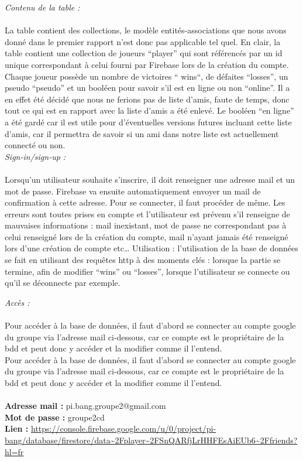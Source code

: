 \documentclass[a4paper,11pt]{article}
\begin{document}
\textit{Contenu de la table :} \\\\
	La table contient des collections, le modèle entités-associations que nous avons donné dans le premier rapport n’est donc pas applicable tel quel. En clair, la table contient une collection de joueurs “player” qui sont référencés par un id unique correspondant à celui fourni par Firebase lors de la création du compte. Chaque joueur possède un nombre de victoires “ wins“, de défaites “losses”, un pseudo “pseudo” et un booléen pour savoir s’il est en ligne ou non “online”. Il a en effet été décidé que nous ne ferions pas de liste d’amis, faute de temps, donc tout ce qui est en rapport avec la liste d’amis a été enlevé. Le booléen “en ligne” a été gardé car il est utile pour d’éventuelles versions futures incluant cette liste d’amis, car il permettra de savoir si un ami dans notre liste est actuellement connecté ou non. \\

\textit{Sign-in/sign-up :} \\\\ 
	Lorsqu’un utilisateur souhaite s’inscrire, il doit renseigner une adresse mail et un mot de passe. Firebase va ensuite automatiquement envoyer un mail de confirmation à cette adresse. Pour se connecter, il faut procéder de même. Les erreurs sont toutes prises en compte et l’utilisateur est prévenu s’il renseigne de mauvaises informations : mail inexistant, mot de passe ne correspondant pas à celui renseigné lors de la création du compte, mail n’ayant jamais été renseigné lors d’une création de compte etc…
Utilisation : l’utilisation de la base de données se fait en utilisant des requêtes http à des moments clés : lorsque la partie se termine, afin de modifier “wins” ou “losses”, lorsque l’utilisateur se connecte ou qu’il se déconnecte par exemple. \\

\newpage

\textit{Accès :} \\\\
Pour accéder à la base de données, il faut d’abord se connecter au compte google du groupe via l’adresse mail ci-dessous, car ce compte est le propriétaire de la bdd et peut donc y accéder et la modifier comme il l’entend. \\


Pour accéder à la base de données, il faut d’abord se connecter au compte google du groupe via l’adresse mail ci-dessous, car ce compte est le propriétaire de la bdd et peut donc y accéder et la modifier comme il l’entend. \\
\\
\textbf{Adresse mail :} pi.bang.groupe2@gmail.com \hfill  \\
\textbf{Mot de passe :} groupe2cd  \\
\textbf{Lien :} \url {https://console.firebase.google.com/u/0/project/pi-bang/database/firestore/data~2Fplayer~2FSnQARfjLrHHFEsAiEUb6~2Ffriends?hl=fr}  \\\\
\end{document}
